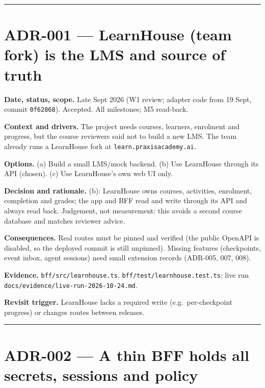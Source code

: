 \documentclass[
  11pt,
]{article}
\begin{document}
\begin{center}\rule{0.5\linewidth}{0.5pt}\end{center}

\hypertarget{adr-001-learnhouse-team-fork-is-the-lms-and-source-of-truth}{%
\section{ADR-001 --- LearnHouse (team fork) is the LMS and source of
truth}\label{adr-001-learnhouse-team-fork-is-the-lms-and-source-of-truth}}

\textbf{Date, status, scope.} Late Sept 2026 (W1 review; adapter code
from 19 Sept, commit \texttt{0f62868}). Accepted. All milestones; M5
read-back.

\textbf{Context and drivers.} The project needs courses, learners,
enrolment and progress, but the course reviewers said not to build a new
LMS. The team already runs a LearnHouse fork at
\texttt{learn.praxisacademy.ai}.

\textbf{Options.} (a) Build a small LMS/mock backend. (b) Use LearnHouse
through its API (chosen). (c) Use LearnHouse's own web UI only.

\textbf{Decision and rationale.} (b): LearnHouse owns courses,
activities, enrolment, completion and grades; the app and BFF read and
write through its API and always read back. Judgement, not measurement:
this avoids a second course database and matches reviewer advice.

\textbf{Consequences.} Real routes must be pinned and verified (the
public OpenAPI is disabled, so the deployed commit is still unpinned).
Missing features (checkpoints, event inbox, agent sessions) need small
extension records (ADR-005, 007, 008).

\textbf{Evidence.} \texttt{bff/src/learnhouse.ts},
\texttt{bff/test/learnhouse.test.ts}; live run
\texttt{docs/evidence/live-run-2026-10-24.md}.

\textbf{Revisit trigger.} LearnHouse lacks a required write
(e.g.~per-checkpoint progress) or changes routes between releases.

\begin{center}\rule{0.5\linewidth}{0.5pt}\end{center}

\hypertarget{adr-002-a-thin-bff-holds-all-secrets-sessions-and-policy}{%
\section{ADR-002 --- A thin BFF holds all secrets, sessions and
policy}\label{adr-002-a-thin-bff-holds-all-secrets-sessions-and-policy}}
\end{document}
